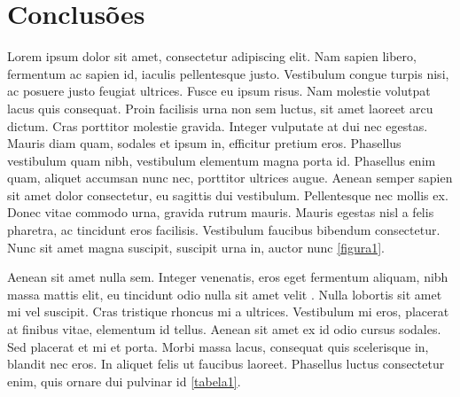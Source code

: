 \section{Conclusões}
Lorem ipsum dolor sit amet, consectetur adipiscing elit. Nam sapien libero, fermentum ac sapien id, iaculis pellentesque justo. Vestibulum congue turpis nisi, ac posuere justo feugiat ultrices. Fusce eu ipsum risus. Nam molestie volutpat lacus quis consequat. Proin facilisis urna non sem luctus, sit amet laoreet arcu dictum. Cras porttitor molestie gravida. Integer vulputate at dui nec egestas. Mauris diam quam, sodales et ipsum in, efficitur pretium eros. Phasellus vestibulum quam nibh, vestibulum elementum magna porta id. Phasellus enim quam, aliquet accumsan nunc nec, porttitor ultrices augue. Aenean semper sapien sit amet dolor consectetur, eu sagittis dui vestibulum. Pellentesque nec mollis ex. Donec vitae commodo urna, gravida rutrum mauris. Mauris egestas nisl a felis pharetra, ac tincidunt eros facilisis. Vestibulum faucibus bibendum consectetur. Nunc sit amet magna suscipit, suscipit urna in, auctor nunc \ref{figura1}.

Aenean sit amet nulla sem. Integer venenatis, eros eget fermentum aliquam, nibh massa mattis elit, eu tincidunt odio nulla sit amet velit \cite{knuth:84}. Nulla lobortis sit amet mi vel suscipit. Cras tristique rhoncus mi a ultrices. Vestibulum mi eros, placerat at finibus vitae, elementum id tellus. Aenean sit amet ex id odio cursus sodales. Sed placerat et mi et porta. Morbi massa lacus, consequat quis scelerisque in, blandit nec eros. In aliquet felis ut faucibus laoreet. Phasellus luctus consectetur enim, quis ornare dui pulvinar id \ref{tabela1}.